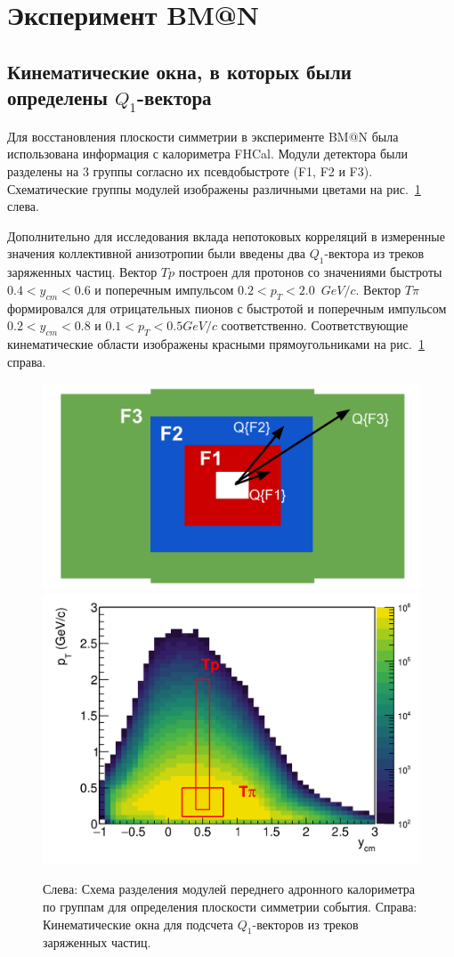 \section{Эксперимент BM@N}

\subsection{Кинематические окна, в которых были определены $Q_1$-вектора}

Для восстановления плоскости симметрии в эксперименте BM@N была использована информация с калориметра FHCal.
Модули детектора были разделены на 3 группы согласно их псевдобыстроте (F1, F2 и F3).
Схематические группы модулей изображены различными цветами на рис.~\ref{fig:bmn_subevents} слева.

Дополнительно для исследования вклада непотоковых корреляций в измеренные значения коллективной анизотропии были введены два $Q_1$-вектора из треков заряженных частиц. 
Вектор $Tp$ построен для протонов со значениями быстроты $0.4<y_{cm}<0.6$ и поперечным импульсом $0.2<p_{T}<2.0$~$GeV/c$.
Вектор $T\pi$ формировался для отрицательных пионов с быстротой и поперечным импульсом $0.2<y_{cm}<0.8$ и $0.1<p_T<0.5 GeV/c$ соответственно.
Соответствующие кинематические области изображены красными прямоугольниками на рис.~\ref{fig:bmn_subevents} справа.
%
\begin{figure}[ht]
\begin{center}
\includegraphics[width=0.45\linewidth]{images/FHCal_layout.png}
\includegraphics[width=0.45\linewidth]{images/pT_ycm_protons.png}
\caption{
Слева: Схема разделения модулей переднего адронного калориметра по группам для определения плоскости симметрии события.
Справа: Кинематические окна для подсчета $Q_1$-векторов из треков заряженных частиц.
}
\label{fig:bmn_subevents}
\end{center}
\end{figure}